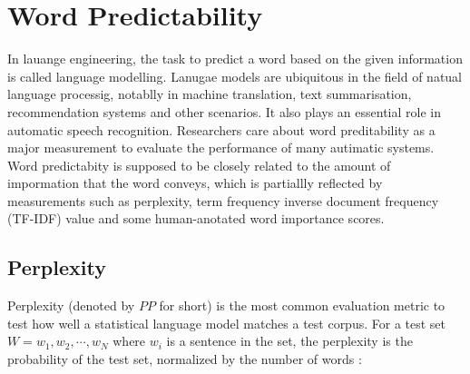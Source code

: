%
%

\section{Word Predictability}
In lauange engineering, the task to predict a word based on the given information is called language modelling. Lanugae models are ubiquitous in the field of natual language processig, notablly in machine translation, text summarisation, recommendation systems and other scenarios. It also plays an essential role in automatic speech recognition. Researchers care about word preditability as a major measurement to evaluate the performance of many autimatic systems. Word predictabity is supposed to be closely related to the amount of impormation that the word conveys, which is partiallly reflected by measurements such as perplexity, term frequency inverse document frequency (TF-IDF) value and some human-anotated word importance scores.


\subsection{Perplexity}
Perplexity (denoted by $PP$ for short) is the most common evaluation metric to test how well a statistical language model matches a test corpus.  For a test set $W = {w_1, w_2, \cdots, w_N}$ where $w_i$ is a sentence in the set, the perplexity is the probability of the test set, normalized by the number of words \citep{Jurafsky2008}:

